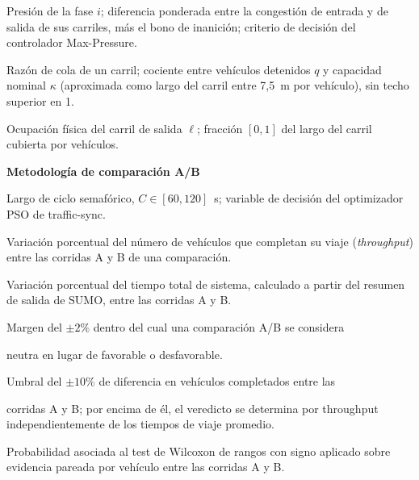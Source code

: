 \begin{description}[leftmargin=3cm, style=sameline, font=\normalfont]
  \item[$P_i$]       Presión de la fase $i$; diferencia ponderada entre la congestión de
                     entrada y de salida de sus carriles, más el bono de inanición;
                     criterio de decisión del controlador Max-Pressure.
  \item[$q/\kappa$]  Razón de cola de un carril; cociente entre vehículos detenidos $q$ y
                     capacidad nominal $\kappa$ (aproximada como largo del carril entre
                     7,5~m por vehículo), sin techo superior en 1.
  \item[$o_\ell$]    Ocupación física del carril de salida $\ell$; fracción $[0,1]$ del
                     largo del carril cubierta por vehículos.
\end{description}

\vspace{0.8cm}
\noindent\textbf{Metodología de comparación A/B}

\vspace{0.3cm}

\begin{description}[leftmargin=3cm, style=sameline, font=\normalfont]
  \item[$C$]         Largo de ciclo semafórico, $C \in [60, 120]$~s; variable de decisión
                     del optimizador PSO de traffic-sync.
  \item[$\Delta$thr] Variación porcentual del número de vehículos que completan su viaje
                     (\emph{throughput}) entre las corridas A y B de una comparación.
  \item[$\Delta$sys] Variación porcentual del tiempo total de sistema, calculado a partir
                     del resumen de salida de SUMO, entre las corridas A y B.
  \item[Banda de]    Margen del $\pm 2\%$ dentro del cual una comparación A/B se considera
  \item[empate]      neutra en lugar de favorable o desfavorable.
  \item[Guardia de]  Umbral del $\pm 10\%$ de diferencia en vehículos completados entre las
  \item[throughput]  corridas A y B; por encima de él, el veredicto se determina por
                     throughput independientemente de los tiempos de viaje promedio.
  \item[$p$-valor]   Probabilidad asociada al test de Wilcoxon de rangos con signo aplicado
                     sobre evidencia pareada por vehículo entre las corridas A y B.
\end{description}

